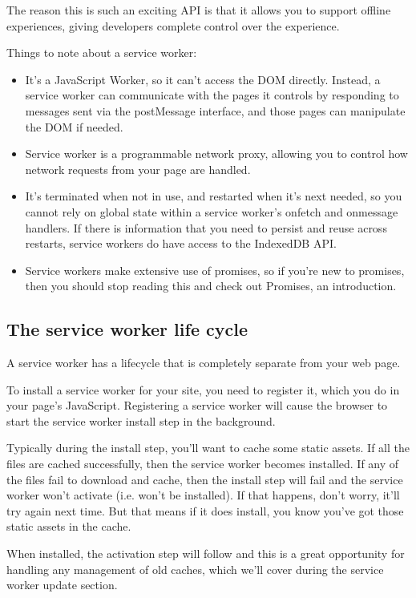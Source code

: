 \documentclass[14pt,a4paper,final]{extreport}
\begin{document}
The reason this is such an exciting API is that it allows you to support offline experiences, giving developers complete control over the experience.

\item Things to note about a service worker:
\begin{itemize}
    \item It's a JavaScript Worker, so it can't access the DOM directly. Instead, a service worker can communicate with the pages it controls by responding to messages sent via the postMessage interface, and those pages can manipulate the DOM if needed.
    \item Service worker is a programmable network proxy, allowing you to control how network requests from your page are handled.
    \item It's terminated when not in use, and restarted when it's next needed, so you cannot rely on global state within a service worker's onfetch and onmessage handlers. If there is information that you need to persist and reuse across restarts, service workers do have access to the IndexedDB API.
    \item Service workers make extensive use of promises, so if you're new to promises, then you should stop reading this and check out Promises, an introduction.
\end{itemize}
\subsection{The service worker life cycle}
\item A service worker has a lifecycle that is completely separate from your web page.

To install a service worker for your site, you need to register it, which you do in your page's JavaScript. Registering a service worker will cause the browser to start the service worker install step in the background.

Typically during the install step, you'll want to cache some static assets. If all the files are cached successfully, then the service worker becomes installed. If any of the files fail to download and cache, then the install step will fail and the service worker won't activate (i.e. won't be installed). If that happens, don't worry, it'll try again next time. But that means if it does install, you know you've got those static assets in the cache.

When installed, the activation step will follow and this is a great opportunity for handling any management of old caches, which we'll cover during the service worker update section.
\end{document}
